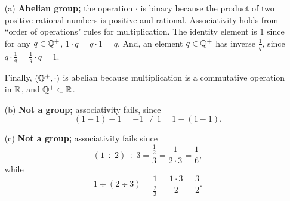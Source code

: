 \documentclass[../UNABRIDGEDalgebraNotesMSRI-UP2016.tex]{subfiles}
\begin{document}
\begin{frame}
\begin{itemize}
\item[(a)] \textbf{Abelian group;} the operation $\cdot$ is binary because the product of two positive rational numbers is positive and rational.  Associativity holds from ``order of operations" rules for multiplication.  The identity element is $1$ since for any $q\in\mathbb Q^+$, $1\cdot q=q\cdot 1=q$.  And, an element $q\in\mathbb Q^+$ has inverse $\frac{1}{q}$, since $q\cdot\frac{1}{q}=\frac{1}{q}\cdot q=1$.

\smallGap
Finally, $(\mathbb Q^+,\cdot)$ is abelian because multiplication is a commutative operation in $\mathbb R$, and $\mathbb Q^+\subset \mathbb R$.  

\smallGap
\item[(b)] \textbf{Not a group;} associativity fails, since
\[
(1-1)-1=-1\; \neq 1=1-(1-1).
\]

\smallGap
\item[(c)] \textbf{Not a group;} associativity fails since 
\[
(1\div 2)\div 3=\frac{\frac{1}{2}}{3}=\frac{1}{2\cdot 3}=\frac{1}{6},
\]
while 
\[
1\div (2\div 3)=\frac{1}{\frac{2}{3}}=\frac{1\cdot 3}{2}=\frac{3}{2}.
\]
\end{itemize}
\end{frame}
\end{document}
